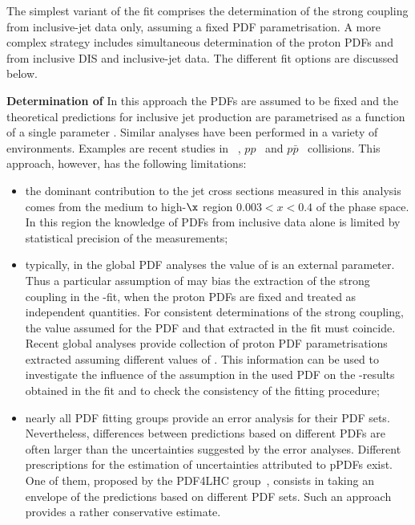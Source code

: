 The simplest variant of the fit comprises the determination of the strong coupling \asz from inclusive-jet data only, assuming a fixed PDF parametrisation. A more complex strategy includes simultaneous determination of the proton PDFs and \asz from inclusive DIS and inclusive-jet data. The different fit options are discussed below.
 
{\flushleft \textbf{Determination of \asz}}\newline
In this approach the PDFs are assumed to be fixed and the theoretical predictions for inclusive jet production are parametrised as a function of a single parameter \asz. Similar analyses have been performed in a variety of environments. Examples are recent studies in \ep~\cite{}, $pp$~\cite{} and $p\bar{p}$~\cite{} collisions. This approach, however, has the following limitations:
\begin{itemize}
 \item the dominant contribution to the jet cross sections measured in this analysis comes from the medium to high-$\x$ region $0.003<x<0.4$ of the phase space. In this region the knowledge of PDFs from \hera inclusive data alone is limited by statistical precision of the measurements;
 \item typically, in the global PDF analyses the value of \asz is an external parameter. Thus a particular assumption of \asz may bias the extraction of the strong coupling in the \as-fit, when the proton PDFs are fixed and treated as independent quantities. For consistent determinations of the strong coupling, the value assumed for the PDF and that extracted in the fit must coincide. Recent global analyses provide collection of proton PDF parametrisations extracted assuming different values of \asz. This information can be used to investigate the influence of the \asz assumption in the used PDF on the \as-results obtained in the fit and to check the consistency of the fitting procedure;
 \item nearly all PDF fitting groups provide an error analysis for their PDF sets. Nevertheless, differences between predictions based on different PDFs are often larger than the uncertainties suggested by the error analyses. Different prescriptions for the estimation of uncertainties attributed to pPDFs exist. One of them, proposed by the PDF4LHC group~\cite{pdf4lhc:2011}, consists in taking an envelope of the predictions based on different PDF sets. Such an approach provides a rather conservative estimate. 
\end{itemize}

